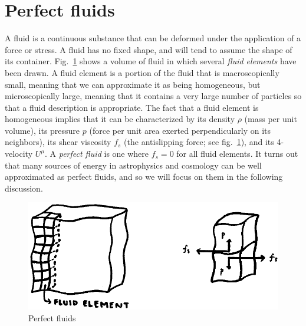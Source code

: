 \documentclass[11pt, a4paper,oneside,openright]{book}
\numberwithin{equation}{section}
\begin{document}
\par\vspace{\baselineskip}

\section{Perfect fluids}

A fluid is a continuous substance that can be deformed under the application of a force or stress. A fluid has no fixed shape, and will tend to assume the shape of its container. Fig.\ \ref{fig:lec4_2} shows a volume of fluid in which several {\it fluid elements} have been drawn. A fluid element is a portion of the fluid that is macroscopically small, meaning that we can approximate it as being homogeneous, but microscopically large, meaning that it contains a very large number of particles so that a fluid description is appropriate. The fact that a fluid element is homogeneous implies that it can be characterized by its density $\rho$ (mass per unit volume), its pressure $p$ (force per unit area exerted perpendicularly on its neighbors), its shear viscosity $f_s$ (the antislipping force; see fig.\ \ref{fig:lec4_2}), and its 4-velocity $U^{\mu}$. A {\it perfect fluid} is one where $f_s=0$ for all fluid elements. It turns out that many sources of energy in astrophysics and cosmology can be well approximated 
as perfect fluids, and so we will focus on them in the following discussion.
\begin{figure}[ht]
\begin{center}
\includegraphics[scale=0.5]{Draw/lec4_2.png}
\end{center}
\caption{Perfect fluids}
\label{fig:lec4_2}
\end{figure}
\end{document}
